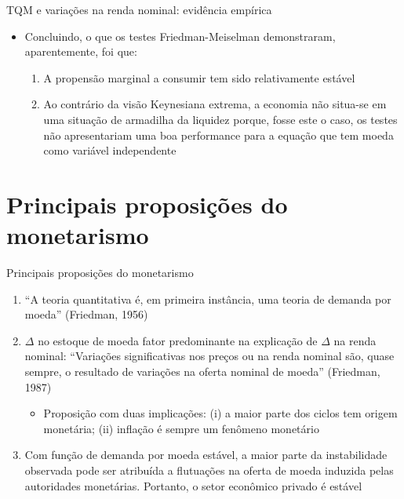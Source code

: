 \documentclass[10pt]{beamer}
\begin{document}
\begin{frame}{TQM e variações na renda nominal: evidência empírica}
    \begin{itemize}
        \item Concluindo, o que os testes Friedman-Meiselman demonstraram, aparentemente, foi que:
        \bigskip
        \begin{enumerate}
            \item A propensão marginal a consumir tem sido relativamente estável
            \bigskip
            \item Ao contrário da visão Keynesiana extrema, a economia não situa-se em uma situação de armadilha da liquidez porque, fosse este o caso, os testes não apresentariam uma boa performance para a equação que tem moeda como variável independente
        \end{enumerate}
    \end{itemize}
\end{frame}

\section{Principais proposições do monetarismo}
\begin{frame}{Principais proposições do monetarismo}
    \begin{enumerate}
        \item ``A teoria quantitativa é, em primeira instância, uma teoria de demanda por moeda'' (Friedman, 1956)
        \bigskip
        \item $\Delta$ no estoque de moeda fator predominante na explicação de $\Delta$ na renda nominal: ``Variações significativas nos preços ou na renda nominal são, quase sempre, o resultado de variações na oferta nominal de moeda'' (Friedman, 1987)
        \bigskip
        \begin{itemize}
            \item Proposição com duas implicações: (i) a maior parte dos ciclos tem origem monetária; (ii) inflação é sempre um fenômeno monetário
        \end{itemize}
        \bigskip
        \item Com função de demanda por moeda estável, a maior parte da instabilidade observada pode ser atribuída a flutuações na oferta de moeda induzida pelas autoridades monetárias. Portanto, o setor econômico privado é estável
    \end{enumerate}
\end{frame}
\end{document}
